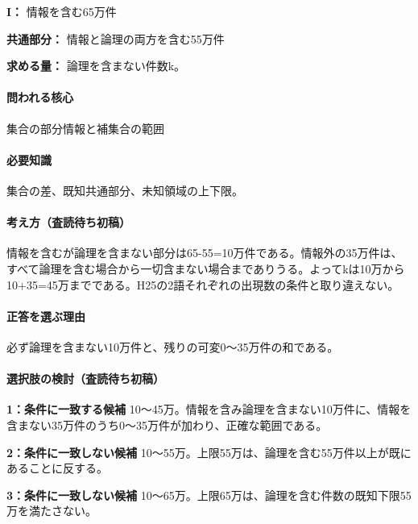 \noindent\textbf{I：} 情報を含む65万件\par

\noindent\textbf{共通部分：} 情報と論理の両方を含む55万件\par

\noindent\textbf{求める量：} 論理を含まない件数k。\par

\paragraph{問われる核心} 集合の部分情報と補集合の範囲

\paragraph{必要知識} 集合の差、既知共通部分、未知領域の上下限。

\paragraph{考え方（査読待ち初稿）} 情報を含むが論理を含まない部分は65-55=\allowbreak{}10万件である。情報外の35万件は、すべて論理を含む場合から一切含まない場合までありうる。よってkは10万から10+35=\allowbreak{}45万までである。H25の2語それぞれの出現数の条件と取り違えない。

\paragraph{正答を選ぶ理由} 必ず論理を含まない10万件と、残りの可変0〜35万件の和である。

\paragraph{選択肢の検討（査読待ち初稿）}\mbox{}\par

\noindent\textbf{1：条件に一致する候補} 10〜45万。情報を含み論理を含まない10万件に、情報を含まない35万件のうち0〜35万件が加わり、正確な範囲である。\par

\noindent\textbf{2：条件に一致しない候補} 10〜55万。上限55万は、論理を含む55万件以上が既にあることに反する。\par

\noindent\textbf{3：条件に一致しない候補} 10〜65万。上限65万は、論理を含む件数の既知下限55万を満たさない。\par

